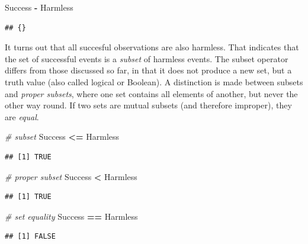 \documentclass[]{svmono}
\newenvironment{Shaded}{\begin{snugshade}}{\end{snugshade}}
\newcommand{\StringTok}[1]{\textcolor[rgb]{0.31,0.60,0.02}{#1}}
\newcommand{\CommentTok}[1]{\textcolor[rgb]{0.56,0.35,0.01}{\textit{#1}}}
\newcommand{\OperatorTok}[1]{\textcolor[rgb]{0.81,0.36,0.00}{\textbf{#1}}}
\newcommand{\NormalTok}[1]{#1}
\theoremstyle{definition}
\theoremstyle{definition}
\theoremstyle{definition}
\theoremstyle{remark}
\begin{document}
\begin{Shaded}
\begin{Highlighting}[]
\NormalTok{Success }\OperatorTok{-}\StringTok{ }\NormalTok{Harmless}
\end{Highlighting}
\end{Shaded}

\begin{verbatim}
## {}
\end{verbatim}

It turns out that all succesful observations are also harmless. That
indicates that the set of successful events is a \emph{subset} of
harmless events. The subset operator differs from those discussed so
far, in that it does not produce a new set, but a truth value (also
called logical or Boolean). A distinction is made between subsets and
\emph{proper subsets}, where one set contains all elements of another,
but never the other way round. If two sets are mutual subsets (and
therefore improper), they are \emph{equal}.

\begin{Shaded}
\begin{Highlighting}[]
\CommentTok{# subset}
\NormalTok{Success }\OperatorTok{<=}\StringTok{ }\NormalTok{Harmless}
\end{Highlighting}
\end{Shaded}

\begin{verbatim}
## [1] TRUE
\end{verbatim}

\begin{Shaded}
\begin{Highlighting}[]
\CommentTok{# proper subset}
\NormalTok{Success }\OperatorTok{<}\StringTok{ }\NormalTok{Harmless}
\end{Highlighting}
\end{Shaded}

\begin{verbatim}
## [1] TRUE
\end{verbatim}

\begin{Shaded}
\begin{Highlighting}[]
\CommentTok{# set equality}
\NormalTok{Success }\OperatorTok{==}\StringTok{ }\NormalTok{Harmless}
\end{Highlighting}
\end{Shaded}

\begin{verbatim}
## [1] FALSE
\end{verbatim}
\end{document}
